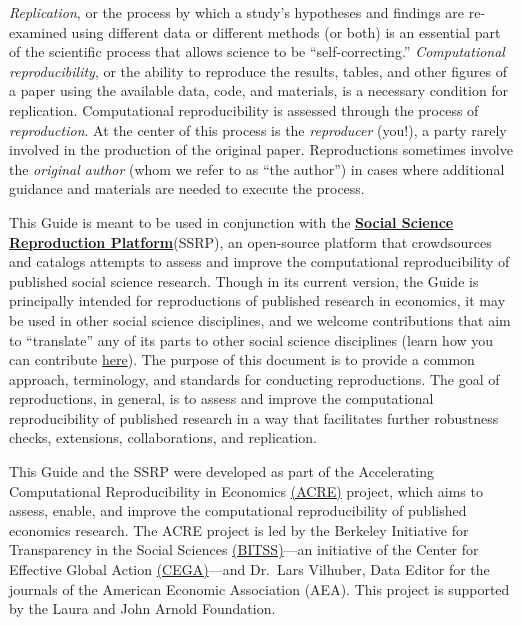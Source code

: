 \documentclass[]{book}
\begin{document}
\emph{Replication}, or the process by which a study's hypotheses and findings are re-examined using different data or different methods (or both) \citep{King95} is an essential part of the scientific process that allows science to be ``self-correcting.'' \emph{Computational reproducibility}, or the ability to reproduce the results, tables, and other figures of a paper using the available data, code, and materials, is a necessary condition for replication. Computational reproducibility is assessed through the process of \emph{reproduction}. At the center of this process is the \emph{reproducer} (you!), a party rarely involved in the production of the original paper. Reproductions sometimes involve the \emph{original author} (whom we refer to as ``the author'') in cases where additional guidance and materials are needed to execute the process.

This Guide is meant to be used in conjunction with the \href{https://www.socialsciencereproduction.org/}{\textbf{Social Science Reproduction Platform}}(SSRP), an open-source platform that crowdsources and catalogs attempts to assess and improve the computational reproducibility of published social science research. Though in its current version, the Guide is principally intended for reproductions of published research in economics, it may be used in other social science disciplines, and we welcome contributions that aim to ``translate'' any of its parts to other social science disciplines (learn how you can contribute \href{https://bitss.github.io/ACRE/contributions.html}{here}). The purpose of this document is to provide a common approach, terminology, and standards for conducting reproductions. The goal of reproductions, in general, is to assess and improve the computational reproducibility of published research in a way that facilitates further robustness checks, extensions, collaborations, and replication.

This Guide and the SSRP were developed as part of the Accelerating Computational Reproducibility in Economics \href{https://www.bitss.org/ecosystem/acre/}{(ACRE)} project, which aims to assess, enable, and improve the computational reproducibility of published economics research. The ACRE project is led by the Berkeley Initiative for Transparency in the Social Sciences \href{https://bitss.org}{(BITSS)}---an initiative of the Center for Effective Global Action \href{https://cega.berkeley.edu/}{(CEGA)}---and Dr.~Lars Vilhuber, Data Editor for the journals of the American Economic Association (AEA). This project is supported by the Laura and John Arnold Foundation.
\end{document}
